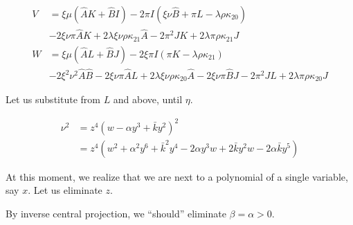 \documentclass[12pt]{article}
\numberwithin{table}{section}
\begin{document}
\begin{align}
V &= \xi \mu(\hat AK  + \hat BI )-2\pi I(\xi \nu \hat B + \pi L - \lambda \rho \kappa_{20}) \\
& -2\xi \nu \pi \hat A K +2 \lambda \xi \nu \rho \kappa_{21} \hat A -2  \pi^2 J K +2 \lambda \pi \rho \kappa_{21} J\\
W &= \xi \mu(\hat AL + \hat BJ) -2\xi \pi I(\pi K - \lambda \rho \kappa_{21})\\
&-2\xi^2 \nu^2 \hat A \hat B -2 \xi \nu \pi \hat A L +2 \lambda \xi \nu \rho \kappa_{20} \hat A-2 \xi \nu \pi \hat B J -2 \pi^2 J L +2 \lambda \pi \rho \kappa_{20} J
\end{align}

Let us substitute from $L$ and above, until $\eta$.

\begin{align}
\nu^2 &= z^4 ( w - \alpha y^3 + \bar k y^2)^2 \\
&= z^4 (w^2 + \alpha^2 y^6 + \bar k^2 y^4 - 2  \alpha y^3 w + 2 \bar k y^2 w - 2 \alpha \bar k y^5)
\end{align}

At this moment, we realize that we are next to a polynomial of a single variable, say $x$. Let us eliminate $z$.

By inverse central projection, we ``should'' eliminate $\beta = \alpha > 0$.
\end{document}
